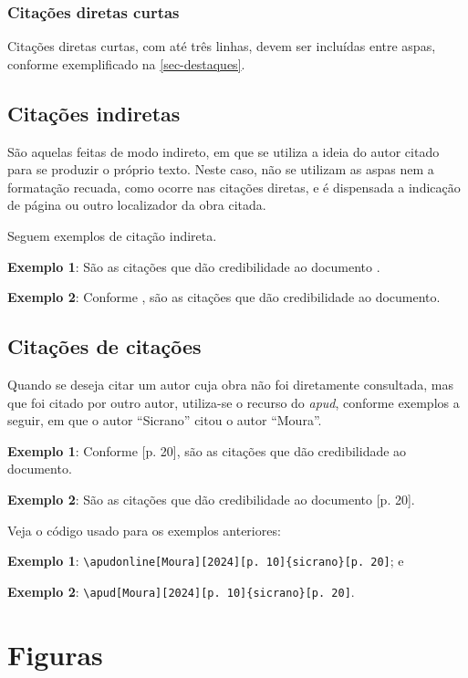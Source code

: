 \subsubsection{Citações diretas curtas}

Citações diretas curtas, com até três linhas, devem ser
incluídas entre aspas, conforme exemplificado na \autoref{sec-destaques}. 

\subsection{Citações indiretas}

São aquelas feitas de modo indireto, em que se utiliza a ideia do autor citado para se produzir o próprio texto. Neste caso, não se utilizam as aspas nem a formatação recuada, como ocorre nas citações diretas, e é dispensada a indicação de página ou outro localizador da obra citada.

Seguem exemplos de citação indireta. 

\noindent \textbf{Exemplo 1}: São as citações que dão credibilidade ao documento \cite{sicrano}.

\noindent \textbf{Exemplo 2}: Conforme , são as citações que dão credibilidade ao documento.

\subsection{Citações de citações}

Quando se deseja citar um autor cuja obra não foi diretamente consultada, mas que foi citado por outro autor, utiliza-se o recurso do \textit{apud}, conforme exemplos a seguir, em que o autor ``Sicrano'' citou o autor ``Moura''.

\noindent \textbf{Exemplo 1}: Conforme [p. 20], são as citações que dão credibilidade ao documento.

\noindent \textbf{Exemplo 2}: São as citações que dão credibilidade ao documento [p. 20].

Veja o código usado para os exemplos anteriores:

\noindent \textbf{Exemplo 1}: \verb|\apudonline[Moura][2024][p. 10]{sicrano}[p. 20]|; e

\noindent \textbf{Exemplo 2}: \verb|\apud[Moura][2024][p. 10]{sicrano}[p. 20]|.

\section{Figuras}

